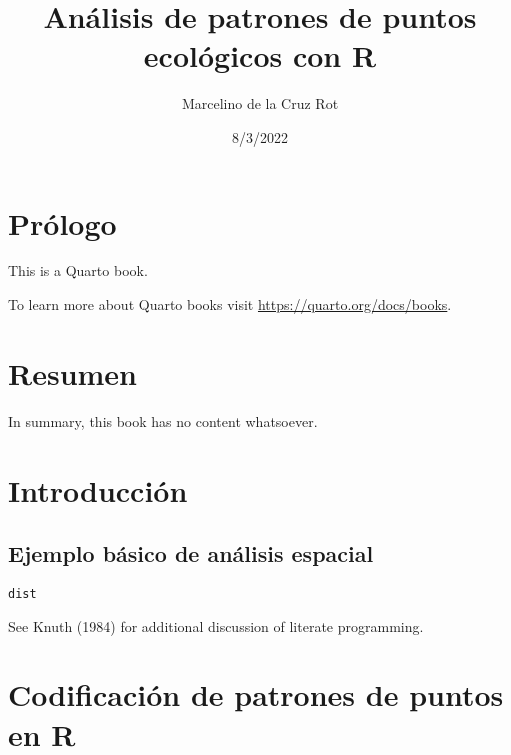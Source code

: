 \documentclass[
  letterpaper,
  DIV=11,
  numbers=noendperiod]{scrreprt}
\title{Análisis de patrones de puntos ecológicos con R}
\author{Marcelino de la Cruz Rot}
\date{8/3/2022}
\renewcommand*\contentsname{Indice de contenidos}
\newcommand\contentsname{Indice de contenidos}
\begin{document}
\maketitle
\ifdefined\Shaded\renewenvironment{Shaded}{\begin{tcolorbox}[borderline west={3pt}{0pt}{shadecolor}, enhanced, boxrule=0pt, interior hidden, frame hidden, breakable, sharp corners]}{\end{tcolorbox}}\fi

\renewcommand*\contentsname{Indice de contenidos}
{
\hypersetup{linkcolor=}
\setcounter{tocdepth}{2}
\tableofcontents
}

\hypertarget{pruxf3logo}{%
\chapter*{Prólogo}\label{pruxf3logo}}

This is a Quarto book.

To learn more about Quarto books visit
\url{https://quarto.org/docs/books}.


\hypertarget{resumen}{%
\chapter*{Resumen}\label{resumen}}

In summary, this book has no content whatsoever.


\hypertarget{introducciuxf3n}{%
\chapter{Introducción}\label{introducciuxf3n}}

\hypertarget{ejemplo-buxe1sico-de-anuxe1lisis-espacial}{%
\section{Ejemplo básico de análisis
espacial}\label{ejemplo-buxe1sico-de-anuxe1lisis-espacial}}

\texttt{dist}

See Knuth (1984) for additional discussion of literate programming.


\hypertarget{codificaciuxf3n-de-patrones-de-puntos-en-r}{%
\chapter{Codificación de patrones de puntos en
R}\label{codificaciuxf3n-de-patrones-de-puntos-en-r}}
\end{document}
